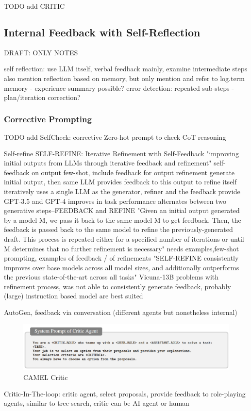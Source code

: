 \documentclass{article}
\begin{document}
TODO add CRITIC \cite{gou_critic_2024}

\subsection{Internal Feedback with Self-Reflection}
DRAFT: ONLY NOTES

self reflection: use LLM itself, verbal feedback mainly, examine intermediate steps
also mention reflection based on memory, but only mention and refer to log.term memory - experience summary
possible? error detection: repeated sub-steps - plan/iteration correction?


\subsubsection{Corrective Prompting}

TODO add SelfCheck: corrective Zero-hot prompt to check CoT reasoning \cite{miao_selfcheck_2023}

Self-refine \cite{madaan_self-refine_2023} SELF-REFINE: Iterative Refinement with Self-Feedback
"improving initial outputs from LLMs through iterative feedback and refinement"
self-feedback on output
few-shot, include feedback for output refinement
generate initial output, then same LLM provides feedback to this output to refine itself iteratively
uses a single LLM as the generator, refiner and the feedback provide
GPT-3.5 and GPT-4
improves in task performance
alternates between two generative steps–FEEDBACK and REFINE
"Given an initial output generated by a model M, we pass it back to the same model M to get feedback. Then, the feedback is passed back to the same model to refine the previously-generated draft. This process is repeated either for a specified number of iterations or until M determines that no further refinement is necessary"
needs examples,few-shot prompting, examples of feedback / of refinements
"SELF-REFINE consistently improves over base models across all model sizes, and additionally outperforms the previous state-of-the-art across all tasks"
Vicuna-13B problems with refinement process, was not able to consistently generate feedback, probably (large) instruction based model are best suited

\cite{wu_autogen_2023} AutoGen, feedback via conversation (different agents but nonetheless internal)

\cite{li_camel_2023}
\begin{figure}[h]
	\centering
	\includegraphics[width=0.9\linewidth]{CAMELCritic.png}
	\caption{CAMEL Critic\cite{li_camel_2023}}
	\label{fig:camel}
\end{figure}
Critic-In-The-loop: critic agent, select proposals, provide feedback to role-playing agents, similar to tree-search, critic can be AI agent or human
\end{document}
